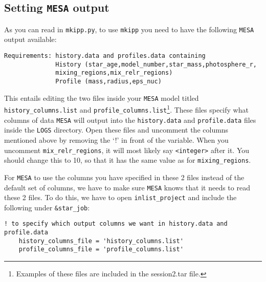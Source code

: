 \documentclass[11pt,a4paper]{article}
\begin{document}
\subsection{Setting \texttt{MESA} output}
As you can read in \texttt{mkipp.py}, to use \texttt{mkipp} you need to have the following \texttt{MESA} output available:
\begin{verbatim}
Requirements: history.data and profiles.data containing 
              History (star_age,model_number,star_mass,photosphere_r,
              mixing_regions,mix_relr_regions)
              Profile (mass,radius,eps_nuc)
\end{verbatim}
This entails editing the two files inside your \texttt{MESA} model titled \texttt{history\_columns.list} and \texttt{profile\_columns.list}\footnote{Examples of these files are included in the session2.tar file.}. These files specify what columns of data \texttt{MESA} will output into the \texttt{history.data} and \texttt{profile.data} files inside the \texttt{LOGS} directory. Open these files and uncomment the columns mentioned above by removing the `!' in front of the variable. When you uncomment \texttt{mix\_relr\_regions}, it will most likely say \texttt{<integer>} after it. You should change this to 10, so that it has the same value as for \texttt{mixing\_regions}.

\bigskip\noindent
For \texttt{MESA} to use the columns you have specified in these 2 files instead of the default set of columns, we have to make sure \texttt{MESA} knows that it needs to read these 2 files. To do this, we have to open \texttt{inlist\_project} and include the following under \texttt{\&star\_job}:
\begin{verbatim}
! to specify which output columns we want in history.data and profile.data
    history_columns_file = 'history_columns.list'
    profile_columns_file = 'profile_columns.list'
\end{verbatim}
\end{document}
